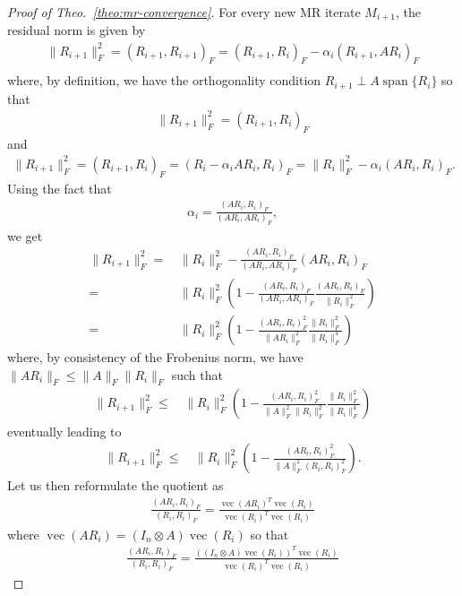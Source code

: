 \documentclass[numbers,webpdf,imanum]{ima-authoring-template}%
\theoremstyle{thmstyletwo}%
\numberwithin{equation}{section}
\begin{document}
\begin{proof}[Proof of Theo.~\ref{theo:mr-convergence}]
For every new MR iterate $M_{i+1}$, the residual norm is given by
\begin{align*}
\|R_{i+1}\|_F^2
=(R_{i+1},R_{i+1})_F
=(R_{i+1},R_i)_F-\alpha_i(R_{i+1},AR_i)_F\\
\end{align*}
where, by definition, we have the orthogonality condition $R_{i+1}\perp A\operatorname{span}\{R_i\}$ so that
\begin{align*}
\|R_{i+1}\|_F^2
=(R_{i+1},R_i)_F
\end{align*}
and
\begin{align}
\|R_{i+1}\|_F^2
=(R_{i+1},R_i)_F
=(R_i-\alpha_i AR_i,R_i)_F
=\|R_i\|_F^2-\alpha_i(AR_i,R_i)_F.
\end{align}
Using the fact that 
\begin{align}
\alpha_i=\frac{(AR_i,R_i)_F}{(AR_i,AR_i)_F},
\end{align}
we get
\begin{align}
\|R_{i+1}\|_F^2
=&\,\|R_i\|_F^2-\frac{(AR_i,R_i)_F}{(AR_i,AR_i)_F}(AR_i,R_i)_F\\
=&\,\|R_i\|_F^2\left(1-\frac{(AR_i,R_i)_F}{(AR_i,AR_i)_F}\frac{(AR_i,R_i)_F}{\|R_i\|_F^2}\right)\\
=&\,\|R_i\|_F^2\left(1-\frac{(AR_i,R_i)_F^2}{\|AR_i\|_F^2}\frac{\|R_i\|_F^2}{\|R_i\|_F^4}\right)
\end{align}
where, by consistency of the Frobenius norm, we have $\|AR_i\|_F\leq\|A\|_F\|R_i\|_F$ such that 
\begin{align}
\|R_{i+1}\|_F^2
\leq&\,\|R_i\|_F^2\left(1-\frac{(AR_i,R_i)_F^2}{\|A\|_F^2\|R_i\|_F^2}\frac{\|R_i\|_F^2}{\|R_i\|_F^4}\right)
\end{align}
eventually leading to
\begin{align}\label{eq:1000}
\|R_{i+1}\|_F^2
\leq&\,\|R_i\|_F^2\left(1-\frac{(AR_i,R_i)_F^2}{\|A\|_F^2(R_i,R_i)_F^2}\right).
\end{align}
Let us then reformulate the quotient as
\begin{align}
\frac{(AR_i,R_i)_F}{(R_i,R_i)_F}
=\frac{\operatorname{vec}(AR_i)^T\operatorname{vec}(R_i)}{\operatorname{vec}(R_i)^T\operatorname{vec}(R_i)}
\end{align}
where $\operatorname{vec}(AR_i)=(I_n\otimes A)\operatorname{vec}(R_i)$ so that
\begin{align}\label{eq:1010}
\frac{(AR_i,R_i)_F}{(R_i,R_i)_F}
=\frac{((I_n\otimes A)\operatorname{vec}(R_i))^T\operatorname{vec}(R_i)}{\operatorname{vec}(R_i)^T\operatorname{vec}(R_i)}

\end{align}
\end{proof}
\end{document}
